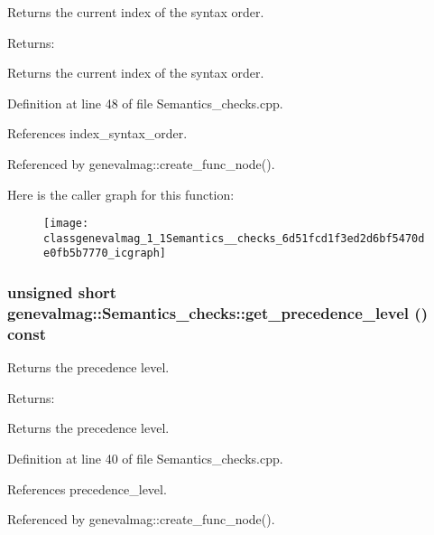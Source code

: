 Returns the current index of the syntax order. \begin{Desc}
\item[Returns:]\end{Desc}
Returns the current index of the syntax order. 

Definition at line 48 of file Semantics\_\-checks.cpp.

References index\_\-syntax\_\-order.

Referenced by genevalmag::create\_\-func\_\-node().

Here is the caller graph for this function:\nopagebreak
\begin{figure}[H]
\begin{center}
\leavevmode
\texttt{[image: classgenevalmag\_1\_1Semantics\_\_checks\_6d51fcd1f3ed2d6bf5470de0fb5b7770\_icgraph]}
\end{center}
\end{figure}
\hypertarget{classgenevalmag_1_1Semantics__checks_d6b0e8d52900149631ae1d38ce61bf94}{
\subsubsection[{get\_\-precedence\_\-level}]{\setlength{\rightskip}{0pt plus 5cm}unsigned short genevalmag::Semantics\_\-checks::get\_\-precedence\_\-level () const}}
\label{classgenevalmag_1_1Semantics__checks_d6b0e8d52900149631ae1d38ce61bf94}


Returns the precedence level. \begin{Desc}
\item[Returns:]\end{Desc}
Returns the precedence level. 

Definition at line 40 of file Semantics\_\-checks.cpp.

References precedence\_\-level.

Referenced by genevalmag::create\_\-func\_\-node().

